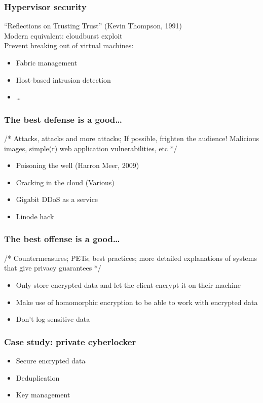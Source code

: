 \documentclass{beamer}
\begin{document}
\begin{frame}
    \frametitle{Hypervisor security}
    ``Reflections on Trusting Trust'' (Kevin Thompson, 1991) \\
    Modern equivalent: cloudburst exploit \\
    Prevent breaking out of virtual machines:
    \begin{itemize}
      \item Fabric management
      \item Host-based intrusion detection
      \item \dots
    \end{itemize}
\end{frame}

\begin{frame}
    \frametitle{The best defense is a good\dots}
    /* Attacks, attacks and more attacks; If possible, frighten the audience!
    Malicious images, simple(r) web application vulnerabilities, etc */
    \begin{itemize}
      \item Poisoning the well (Harron Meer, 2009)
      \item Cracking in the cloud (Various) %
      \item Gigabit DDoS as a service %
      \item Linode hack
    \end{itemize}
\end{frame}

\begin{frame}
    \frametitle{The best offense is a good\dots}
    /* Countermeasures; PETs; best practices; more detailed explanations of
    systems that give privacy guarantees */
    \begin{itemize}
      \item Only store encrypted data and let the client encrypt it on their machine
      \item Make use of homomorphic encryption to be able to work with encrypted data
      \item Don't log sensitive data
    \end{itemize}
\end{frame}

\begin{frame}
    \frametitle{Case study: private cyberlocker}
    \begin{itemize}
    \item Secure encrypted data
    \item Deduplication
    \item Key management
    \end{itemize}
\end{frame}
\end{document}
